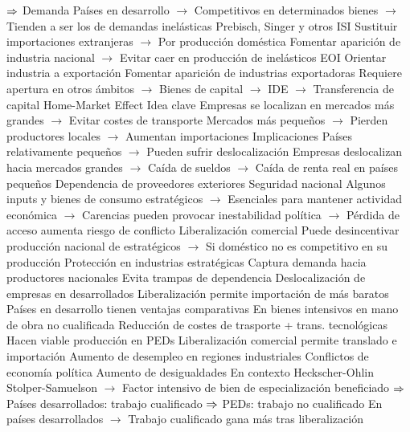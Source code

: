 \documentclass{nuevotema}
\begin{document}
\begin{esquemal}
				\4[] $\then$ Demanda
				\4[] Países en desarrollo
				\4[] $\to$ Competitivos en determinados bienes
				\4[] $\to$ Tienden a ser los de demandas inelásticas
				\4[] Prebisch, Singer y otros
				\4 ISI
				\4[] Sustituir importaciones extranjeras
				\4[] $\to$ Por producción doméstica
				\4[] Fomentar aparición de industria nacional
				\4[] $\to$ Evitar caer en producción de inelásticos
				\4 EOI
				\4[] Orientar industria a exportación
				\4[] Fomentar aparición de industrias exportadoras
				\4[] Requiere apertura en otros ámbitos
				\4[] $\to$ Bienes de capital
				\4[] $\to$ IDE
				\4[] $\to$ Transferencia de capital
			\3 Home-Market Effect
				\4 Idea clave
				\4[] Empresas se localizan en mercados más grandes
				\4[] $\to$ Evitar costes de transporte
				\4[] Mercados más pequeños
				\4[] $\to$ Pierden productores locales
				\4[] $\to$ Aumentan importaciones
				\4 Implicaciones
				\4[] Países relativamente pequeños
				\4[] $\to$ Pueden sufrir deslocalización
				\4[] Empresas deslocalizan hacia mercados grandes
				\4[] $\to$ Caída de sueldos
				\4[] $\to$ Caída de renta real en países pequeños
			\3 Dependencia de proveedores exteriores
				\4 Seguridad nacional
				\4[] Algunos inputs y bienes de consumo estratégicos
				\4[] $\to$ Esenciales para mantener actividad económica
				\4[] $\to$ Carencias pueden provocar inestabilidad política
				\4[] $\to$ Pérdida de acceso aumenta riesgo de conflicto
				\4 Liberalización comercial
				\4[] Puede desincentivar producción nacional de estratégicos
				\4[] $\to$ Si doméstico no es competitivo en su producción
				\4 Protección en industrias estratégicas
				\4[] Captura demanda hacia productores nacionales
				\4[] Evita trampas de dependencia
			\3 Deslocalización de empresas en desarrollados
				\4 Liberalización permite importación de más baratos
				\4 Países en desarrollo tienen ventajas comparativas
				\4[] En bienes intensivos en mano de obra no cualificada
				\4 Reducción de costes de trasporte + trans. tecnológicas
				\4[] Hacen viable producción en PEDs
				\4 Liberalización comercial permite translado e importación
				\4[$\then$] Aumento de desempleo en regiones industriales
				\4[$\then$] Conflictos de economía política
			\3 Aumento de desigualdades
				\4 En contexto Heckscher-Ohlin
				\4[] Stolper-Samuelson
				\4[] $\to$ Factor intensivo de bien de especialización beneficiado
				\4[] $\then$ Países desarrollados: trabajo cualificado
				\4[] $\then$ PEDs: trabajo no cualificado
				\4[] En países desarrollados
				\4[] $\to$ Trabajo cualificado gana más tras liberalización

\end{esquemal}
\end{document}
